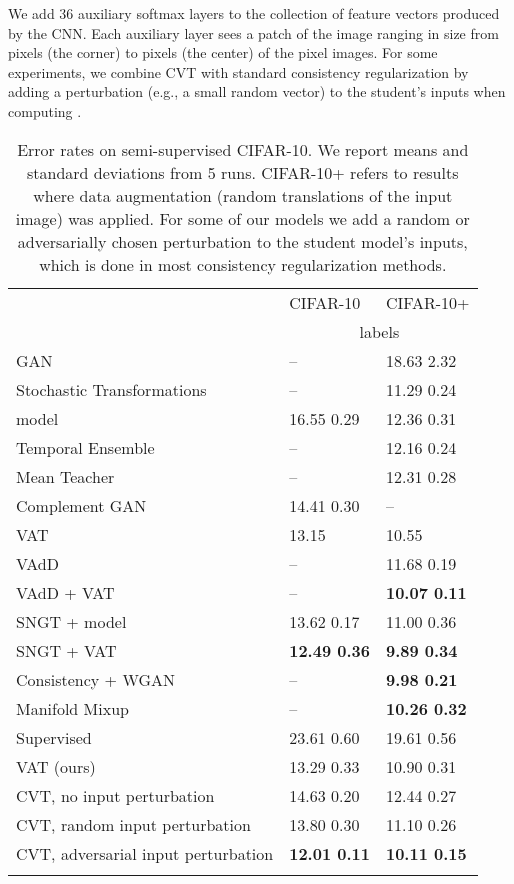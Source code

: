 \documentclass[11pt,a4paper]{article}
\newcommand\Tstrut{\rule{0pt}{2.6ex}}         \newcommand\Bstrut{\rule[-1.0ex]{0pt}{0pt}}   \newcommand{\thinline}{\Xhline{1.0\arrayrulewidth}}
\newcommand{\thickline}{\Xhline{2.5\arrayrulewidth}}
\newcommand{\tsep}	{\Bstrut \\ \thinline}
\newcommand{\ttop}{\thickline}
\newcommand{\tbottom}{\Bstrut \\ \thickline}
\begin{document}
We add 36 auxiliary softmax layers to the  collection of feature vectors produced by the CNN.
Each auxiliary layer sees a patch of the image ranging in size from  pixels (the corner) to  pixels (the center) of the  pixel images.
For some experiments, we combine CVT with standard consistency regularization by adding a perturbation (e.g., a small random vector) to the student's inputs when computing . 


\addtolength{\tabcolsep}{15pt}
\begin{table*}[h!]
\begin{tabular}{l l l}
\ttop
\multirow{2}{*}{Method} & CIFAR-10 & CIFAR-10+\Tstrut \\
             &  \multicolumn{2}{c}{ labels}\tsep
 GAN \cite{salimans2016improved} & -- & 18.63  2.32\Tstrut\\
 Stochastic Transformations \cite{sajjadi2016regularization}  & -- & 11.29  0.24\\
  model \cite{laine2016temporal}  & 16.55  0.29 & 12.36  0.31 \\
 Temporal Ensemble \cite{laine2016temporal}  & -- & 12.16  0.24 \\
 Mean Teacher \cite{tarvainen2017weight} & -- & 12.31  0.28 \\
 Complement GAN \cite{dai2017good}  & 14.41  0.30 & -- \\
 VAT \cite{miyato2017virtual} & 13.15 & 10.55 \\
 VAdD \cite{park2017adversarial} & -- & 11.68  0.19 \\
 VAdD + VAT \cite{park2017adversarial}  & -- & \textbf{10.07  0.11} \\
 SNGT +  model \cite{luong17} & 13.62  0.17 & 11.00  0.36 \\
 SNGT + VAT \cite{luong17}  & \textbf{12.49  0.36} & \textbf{9.89  0.34} \\
 Consistency + WGAN \cite{wei2018improving} & -- & \textbf{9.98  0.21} \\
 Manifold Mixup \cite{verma2018manifold} & -- &  \textbf{10.26  0.32} 
 \tsep
 Supervised & 23.61  0.60 & 19.61  0.56 \Tstrut\\
 VAT (ours)  & 13.29  0.33 & 10.90  0.31\\
 CVT, no input perturbation  & 14.63  0.20 & 12.44  0.27 \\
 CVT, random input perturbation & 13.80  0.30 & 11.10  0.26 \\
 CVT, adversarial input perturbation  & \textbf{12.01  0.11} & \textbf{10.11  0.15}\tbottom
\end{tabular}
\vspace{1mm}
\caption{
		Error rates on semi-supervised CIFAR-10. We report means and standard deviations from 5 runs.
		CIFAR-10+ refers to results where data augmentation (random translations of the input image) was applied. For some of our models we add a random or adversarially chosen perturbation to the student model's inputs, which is done in most consistency regularization methods.
}
\label{tab:vision}
\end{table*}
\addtolength{\tabcolsep}{-15pt}
\end{document}
